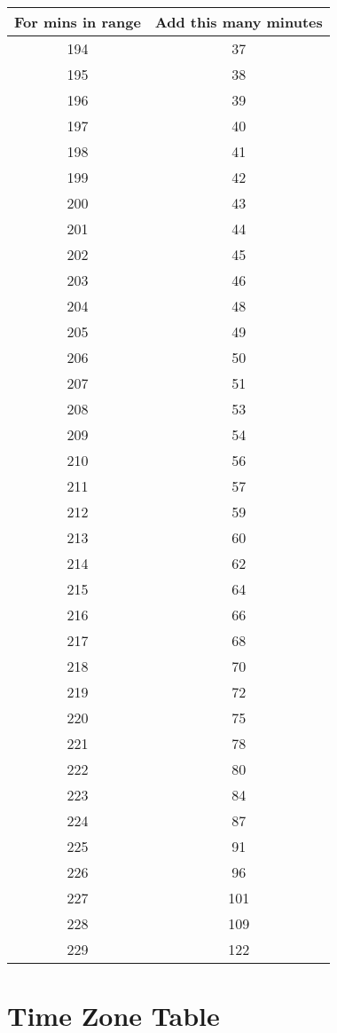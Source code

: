 		\begin{minipage}{0.5\textwidth}\begin{tabular}[t]{c|c}
					For mins in range & Add this many minutes \\\hline
						194 & 37 \\\hline
					195 & 38 \\\hline
						196 & 39 \\\hline
					197 & 40 \\\hline
					198 & 41 \\\hline
					199 & 42 \\\hline
	200 & 43 \\\hline
	201 & 44 \\\hline
	202 & 45 \\\hline
	203 & 46 \\\hline
	204 & 48 \\\hline
	205 & 49 \\\hline
	206 & 50 \\\hline
	207 & 51 \\\hline
	208 & 53 \\\hline
	209 & 54 \\\hline
	210 & 56 \\\hline
	211 & 57 \\\hline
	212 & 59 \\\hline
	213 & 60 \\\hline
	214 & 62 \\\hline
	215 & 64 \\\hline
	216 & 66 \\\hline
	217 & 68 \\\hline
	218 & 70 \\\hline
	219 & 72 \\\hline
	220 & 75 \\\hline
	221 & 78 \\\hline
	222 & 80 \\\hline
	223 & 84 \\\hline
	224 & 87 \\\hline
	225 & 91 \\\hline
	226 & 96 \\\hline
	227 & 101 \\\hline
	228 & 109 \\\hline
	229 & 122
\end{tabular}\end{minipage}\newpage

\section{Time Zone Table}


